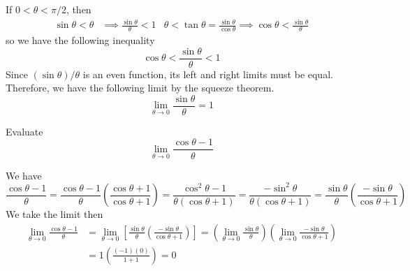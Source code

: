 If \(0<\theta<\pi/2\), then
\begin{align*}
    \sin\theta<\theta &\implies \frac{\sin\theta}{\theta}<1
    & \theta<\tan\theta=\frac{\sin\theta}{\cos\theta}\implies\cos\theta
    <\frac{\sin\theta}{\theta}
\end{align*}
so we have the following inequality
\[\cos\theta<\frac{\sin\theta}{\theta}<1\]
Since \((\sin\theta)/\theta\) is an even function, its left and right limits
must be equal.
Therefore, we have the following limit by the squeeze theorem.
\[\lim_{\theta\to 0}\frac{\sin\theta}{\theta}=1\]
\begin{problem}
    Evaluate \[\lim_{\theta\to 0}\frac{\cos\theta-1}{\theta}\]
\end{problem}
\begin{solution}
    We have
    \[\frac{\cos\theta-1}{\theta}
    =\frac{\cos\theta-1}{\theta}\left(\frac{\cos\theta+1}{\cos\theta+1}\right)
    =\frac{\cos^2\theta-1}{\theta(\cos\theta+1)}
    =\frac{-\sin^2\theta}{\theta(\cos\theta+1)}
    =\frac{\sin\theta}{\theta}\left(\frac{-\sin\theta}{\cos\theta+1}\right)\]
    We take the limit then
    \begin{align*}
        \lim_{\theta\to 0}\frac{\cos\theta-1}{\theta}
        &= \lim_{\theta\to 0}\left[\frac{\sin\theta}{\theta}
        \left(\frac{-\sin\theta}{\cos\theta+1}\right)\right]
        =\left(\lim_{\theta\to 0}\frac{\sin\theta}{\theta}\right)
        \left(\lim_{\theta\to 0}\frac{-\sin\theta}{\cos\theta+1}\right) \\
        &= 1\left(\frac{(-1)(0)}{1+1}\right)=0 
    \end{align*}
\end{solution}